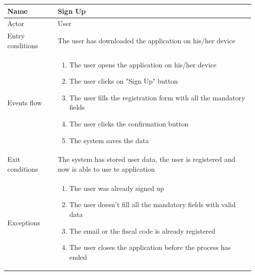 \documentclass{article}
\begin{document}
\begin{table}[H]
    \begin{tabular}{|l|l|}
    \hline
     Name & Sign Up \\ \hline  
     Actor & User\\ \hline 
     Entry conditions &  The user has downloaded the application on his/her
     device\\ \hline 
     Events flow & 
     \begin{minipage}[t]{0.7\textwidth}
     \begin{enumerate}
        \item The user opens the application on his/her device
        \item The user clicks on "Sign Up" button
        \item The user fills the registration form with all the mandatory fields
        \item The user clicks the confirmation button
        \item The system saves the data
     \end{enumerate}
    \end{minipage} \\ \hline
     Exit conditions & \begin{minipage}[t]{0.7\textwidth}The system has stored
     user data, the user is registered and now is able to use te application
     \end{minipage}\\ \hline
     Exceptions & \begin{minipage}[t]{0.7\textwidth} \begin{enumerate}
         \item The user was already signed up
         \item The user doesn't fill all the mandatory fields with valid data
         \item The email or the fiscal code is already registered
         \item The user closes the application before the process has ended
     \end{enumerate}\end{minipage} \\ \hline
    \end{tabular}
\end{table}
\end{document}

